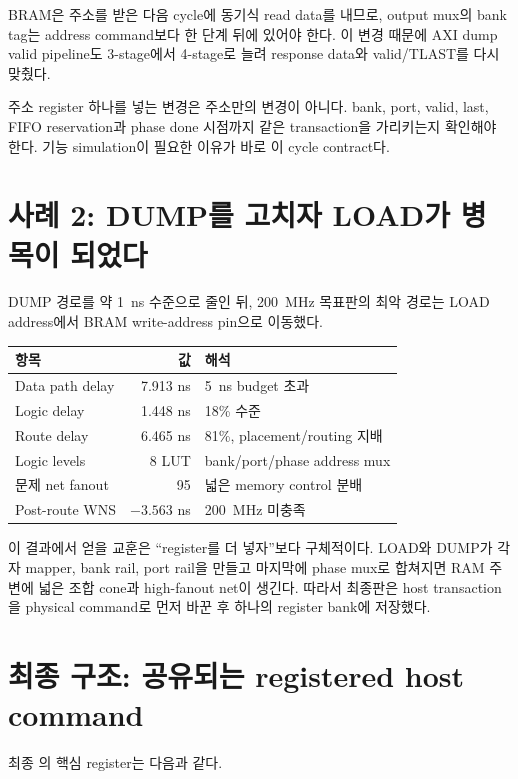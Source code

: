 BRAM은 주소를 받은 다음 cycle에 동기식 read data를 내므로, output mux의 bank
tag는 address command보다 한 단계 뒤에 있어야 한다. 이 변경 때문에 AXI dump
valid pipeline도 3-stage에서 4-stage로 늘려 response data와 valid/TLAST를 다시
맞췄다.

\begin{warningbox}
주소 register 하나를 넣는 변경은 주소만의 변경이 아니다. bank, port, valid,
last, FIFO reservation과 phase done 시점까지 같은 transaction을 가리키는지
확인해야 한다. 기능 simulation이 필요한 이유가 바로 이 cycle contract다.
\end{warningbox}

\section{사례 2: DUMP를 고치자 LOAD가 병목이 되었다}

DUMP 경로를 약 1~ns 수준으로 줄인 뒤, 200~MHz 목표판의 최악 경로는 LOAD
address에서 BRAM write-address pin으로 이동했다.

\begin{longtable}{L{41mm}rL{73mm}}
\toprule
항목 & 값 & 해석 \\
\midrule
Data path delay & 7.913 ns & 5~ns budget 초과 \\
Logic delay & 1.448 ns & 18\% 수준 \\
Route delay & 6.465 ns & 81\%, placement/routing 지배 \\
Logic levels & 8 LUT & bank/port/phase address mux \\
문제 net fanout & 95 & 넓은 memory control 분배 \\
Post-route WNS & $-3.563$ ns & 200~MHz 미충족 \\
\bottomrule
\end{longtable}

이 결과에서 얻을 교훈은 ``register를 더 넣자''보다 구체적이다. LOAD와 DUMP가
각자 mapper, bank rail, port rail을 만들고 마지막에 phase mux로 합쳐지면 RAM
주변에 넓은 조합 cone과 high-fanout net이 생긴다. 따라서 최종판은 host
transaction을 physical command로 먼저 바꾼 후 하나의 register bank에 저장했다.

\section{최종 구조: 공유되는 registered host command}

최종 의 핵심 register는 다음과 같다.

